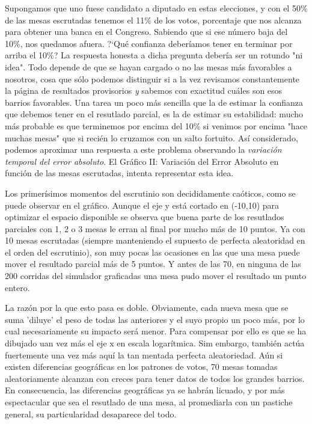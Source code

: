 \documentclass[12pt, a4paper]{article}
\begin{document}
Supongamos que uno fuese candidato a diputado en estas elecciones, y con el 50\% de las mesas escrutadas tenemos el 11\% de los votos, porcentaje que nos alcanza para obtener una banca en el Congreso. Sabiendo que si ese n\'umero baja del 10\%, nos quedamos afuera. ?`Qu\'e confianza deber\'iamos tener en terminar por arriba el 10\%?
La respuesta honesta a dicha pregunta deber\'ia ser un rotundo "ni idea". Todo depende de que se hayan cargado o no las mesas m\'as favorables a nosotros, cosa que s\'olo podemos distinguir si a la vez revisamos constantemente la p\'agina de resultados provisorios \emph{y} sabemos con exactitud cu\'ales son esos barrios favorables.
Una tarea un poco m\'as sencilla que la de estimar la confianza que debemos tener en el resutlado parcial, es la de estimar su estabilidad: mucho m\'as probable es que terminemos por encima del 10\% si venimos por encima "hace muchas mesas" que si reci\'en lo cruzamos con un salto fortuito. As\'i considerado, podemos aproximar una respuesta a este problema observando la \emph{variaci\'on temporal del error absoluto}. El Gr\'afico II: Variaci\'on del Error Absoluto en funci\'on de las mesas escrutadas, intenta representar esta idea.

Los primer\'isimos momentos del escrutinio son decididamente ca\'oticos, como se puede observar en el gr\'afico. Aunque el eje y est\'a cortado en (-10,10) para optimizar el espacio disponible se observa que buena parte de los resutlados parciales con 1, 2 o 3 mesas le erran al final por mucho m\'as de 10 puntos. Ya con 10 mesas escrutadas (siempre manteniendo el supuesto de perfecta aleatoridad en el orden del escrutinio), son muy pocas las ocasiones en las que una mesa puede mover el resultado parcial m\'as de 5 puntos. Y antes de las 70, en ninguna de las 200 corridas del simulador graficadas una mesa pudo mover el resultado un punto entero.

La raz\'on por la que esto pasa es doble. Obviamente, cada nueva mesa que se suma 'diluye' el peso de todas las anteriores y el suyo propio un poco m\'as, por lo cual necesariamente su impacto ser\'a menor. Para compensar por ello es que se ha dibujado uan vez m\'as el eje x en escala logar\'itmica. Sim embargo, tambi\'en act\'ua fuertemente una vez m\'as aqu\'i la tan mentada perfecta aleatoriedad. A\'un si existen diferencias geogr\'aficas en los patrones de votos, 70 mesas tomadas aleatoriamente alcanzan con creces para tener datos de todos los grandes barrios. En consecuencia, las diferencias geogr\'aficas ya se habr\'an licuado, y por m\'as espectacular que sea el resutlado de una mesa, al promediarla con un pastiche general, su particularidad desaparece del todo.
\end{document}

